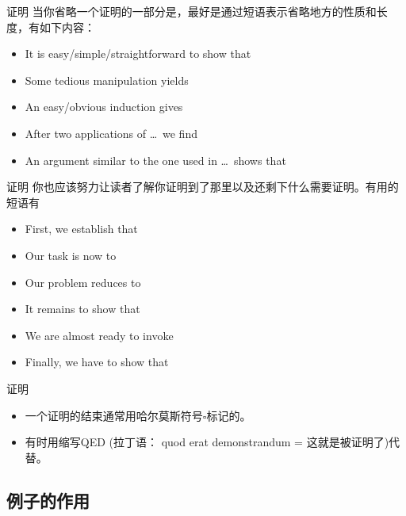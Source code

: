 \documentclass[13pt]{ctexbeamer}
\begin{document}
\begin{frame}{证明}
当你省略一个证明的一部分是，最好是通过短语表示省略地方的性质和长度，有如下内容：
	\begin{itemize}
		\item It is easy/simple/straightforward to show that 
		\item Some tedious manipulation yields
		\item An easy/obvious induction gives 
		\item After two applications of  \dots ~we find
		\item An argument similar to the one used in  \dots ~shows that 
	\end{itemize}
\end{frame}

\begin{frame}{证明}
你也应该努力让读者了解你证明到了那里以及还剩下什么需要证明。有用的短语有
	\begin{itemize}
		\item First, we establish that 
		\item Our task is now to 
		\item Our problem reduces to 
		\item It remains to show that 
		\item We are almost ready to invoke 
		\item Finally, we have to show that 
	\end{itemize}
\end{frame}

\begin{frame}{证明}
\begin{itemize}
\item 
一个证明的结束通常用哈尔莫斯符号$\square$标记的。
\item 
有时用缩写QED  (拉丁语： quod erat demonstrandum = 这就是被证明了)代替。
\end{itemize}
\end{frame}


\subsection{例子的作用}
\end{document}
